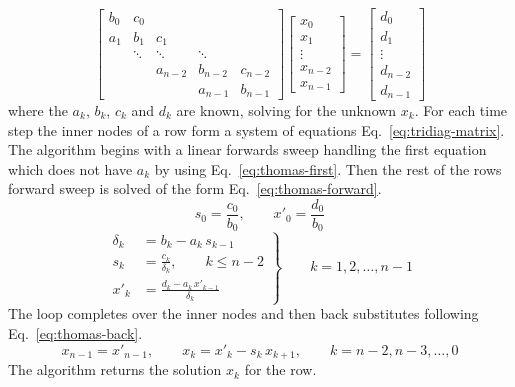 \documentclass[conf]{new-aiaa}
\begin{document}
\begin{equation}
  \begin{bmatrix}
    b_0    & c_0    &        &         &         \\
    a_1    & b_1    & c_1    &         &         \\
           & \ddots & \ddots & \ddots  &         \\
           &        & a_{n-2}& b_{n-2} & c_{n-2} \\
           &        &        & a_{n-1} & b_{n-1}
  \end{bmatrix}
  \begin{bmatrix} x_0 \\ x_1 \\ \vdots \\ x_{n-2} \\ x_{n-1} \end{bmatrix}
  =
  \begin{bmatrix} d_0 \\ d_1 \\ \vdots \\ d_{n-2} \\ d_{n-1} \end{bmatrix}
  \label{eq:tridiag-matrix}
\end{equation}
where the $a_k$, $b_k$, $c_k$ and $d_k$ are known, solving for the unknown $x_k$.
For each time step the inner nodes of a row form a system of equations Eq.~\eqref{eq:tridiag-matrix}.
The algorithm begins with a linear forwards sweep handling the first equation which does not have $a_k$ 
by using Eq.~\eqref{eq:thomas-first}. Then the rest of the rows forward sweep is solved of the form Eq.~\eqref{eq:thomas-forward}.
\begin{equation}
  s_0 = \frac{c_0}{b_0}, \qquad
  x'_0 = \frac{d_0}{b_0}
  \label{eq:thomas-first}
\end{equation}
\begin{equation}
  \left.
  \begin{aligned}
    \delta_k &= b_k - a_k\,s_{k-1} \\
    s_k      &= \frac{c_k}{\delta_k}, \qquad k \le n-2 \\
    x'_k     &= \frac{d_k - a_k\,x'_{k-1}}{\delta_k}
  \end{aligned}
  \right\}
  \qquad k = 1, 2, \dots, n-1
  \label{eq:thomas-forward}
\end{equation}
The loop completes over the inner nodes and then back substitutes following Eq.~\eqref{eq:thomas-back}.
\begin{equation}
  x_{n-1} = x'_{n-1}, \qquad
  x_k = x'_k - s_k\,x_{k+1}, \qquad k = n-2, n-3, \dots, 0
  \label{eq:thomas-back}
\end{equation}
The algorithm returns the solution $x_k$ for the row.
\end{document}
